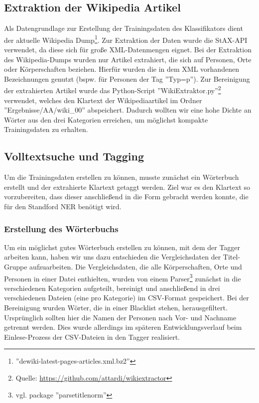 \documentclass[a4paper]{article}
\begin{document}
	\subsection{Extraktion der Wikipedia Artikel}
		Als Datengrundlage zur Erstellung der Trainingsdaten des Klassifikators dient der aktuelle Wikipedia Dump\footnote{''dewiki-latest-pages-articles.xml.bz2''}.
		Zur Extraktion der Daten wurde die StAX-API verwendet, da diese sich für große XML-Datenmengen eignet.
		Bei der Extraktion des Wikipedia-Dumps wurden nur Artikel extrahiert, die sich auf Personen, Orte oder Körperschaften beziehen. Hierfür wurden die in dem XML vorhandenen Bezeichnungen genutzt (bspw. für Personen der Tag ''Typ=p'').
		Zur Bereinigung der extrahierten Artikel wurde das Python-Script ''WikiExtraktor.py''\footnote{Quelle: \url{https://github.com/attardi/wikiextractor}} verwendet, welches den Klartext der Wikipediaartikel im Ordner ''Ergebnisse/AA/wiki\_00'' abspeichert. Dadurch wollten wir eine hohe Dichte an Wörter aus den drei Kategorien erreichen, um möglichst kompakte Trainingsdaten zu erhalten.

	\subsection{Volltextsuche und Tagging}
		Um die Trainingsdaten erstellen zu können, musste zunächst ein Wörterbuch erstellt und der extrahierte Klartext getaggt werden.
		Ziel war es den Klartext so vorzubereiten, dass dieser anschließend in die Form gebracht werden konnte, die für den Standford NER benötigt wird.

		\subsubsection{Erstellung des Wörterbuchs}
			Um ein möglichst gutes Wörterbuch erstellen zu können, mit dem der Tagger arbeiten kann, haben wir uns dazu entschieden die Vergleichsdaten der Titel-Gruppe aufzuarbeiten.
			Die Vergleichsdaten, die alle Körperschaften, Orte und Personen in einer Datei enthielten, wurden von einem Parser\footnote{vgl. package ''parsetitlenorm''} zunächst in die verschiedenen Kategorien aufgeteilt, bereinigt und anschließend in drei verschiedenen Dateien (eine pro Kategorie) im CSV-Format gespeichert.
			Bei der Bereinigung wurden Wörter, die in einer Blacklist stehen, herausgefiltert.
			Ursprünglich sollten hier die Namen der Personen nach Vor- und Nachname getrennt werden. 
			Dies wurde allerdings im späteren Entwicklungsverlauf beim Einlese-Prozess der CSV-Dateien in den Tagger realisiert.
\end{document}
